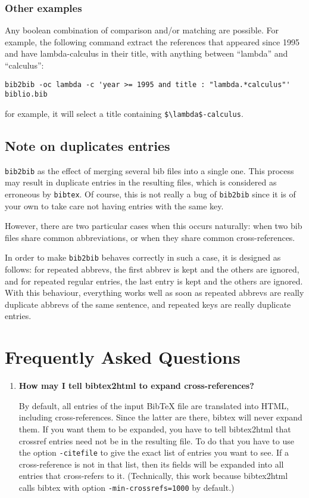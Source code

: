 \documentclass[11pt,a4paper]{article}
\begin{document}
\subsubsection{Other examples}

Any boolean combination of comparison and/or matching are
possible. For example, the following command extract the references
that appeared since 1995 and have lambda-calculus in their title, with
anything between ``lambda'' and ``calculus'':
\begin{verbatim}
bib2bib -oc lambda -c 'year >= 1995 and title : "lambda.*calculus"' biblio.bib
\end{verbatim}
for example, it will select a title containing
\verb|$\lambda$-calculus|. 

\subsection{Note on duplicates entries}
 
\verb|bib2bib| as the effect of merging several bib files into a
single one. This process may result in duplicate entries in the
resulting files, which is considered as erroneous by \verb|bibtex|.  
Of course, this is not really a bug of \verb|bib2bib| since it is of
your own to take care not having entries with the same key. 

However, there are two particular cases when this occurs naturally:
when two bib files share common abbreviations, or when they share
common cross-references. 

In order to make \verb|bib2bib| behaves correctly in such a case,
it is designed as follows: for repeated abbrevs, the first abbrev is kept and
the others are ignored, and for repeated regular entries, the last entry
is kept and the others are ignored.  With this behaviour, everything
works well as soon as repeated abbrevs are really duplicate abbrevs of
the same sentence, and repeated keys are really duplicate
entries. 

\section{Frequently Asked Questions}

\begin{enumerate}

\item \textbf{How may I tell bibtex2html to expand cross-references?} ~

  By default, all entries of the input BibTeX file are translated into
  HTML, including cross-references. Since the latter are there, bibtex
  will never expand them. If you want them to be expanded, you have to
  tell bibtex2html that crossref entries need not be in the resulting
  file. To do that you have to use the option \verb|-citefile| to give
  the exact list of entries you want to see. If a cross-reference is
  not in that list, then its fields will be expanded into all entries
  that cross-refers to it. (Technically, this work because bibtex2html
  calls bibtex with option \verb|-min-crossrefs=1000| by default.)
  
\end{enumerate}

\end{document}
